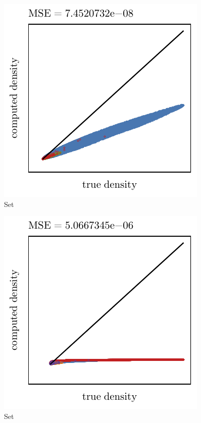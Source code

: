 \begin{subfigure}{0.3\textwidth}
	\centering
	\includegraphics[keepaspectratio=true, width=\textwidth, height=0.23\textheight]{4/img/results_baakman_2_60000_mbe_breiman.pdf}
	\caption{Set \baakmanTwo}
	\label{fig:4:simulated:datasets:mbe:baakman2}
\end{subfigure}	
\begin{subfigure}{0.3\textwidth}
	\centering
	\includegraphics[keepaspectratio=true, width=\textwidth, height=0.23\textheight]{4/img/results_baakman_3_120000_mbe_breiman.pdf}
	\caption{Set \baakmanThree}
	\label{fig:4:simulated:datasets:mbe:baakman3}
\end{subfigure}				

